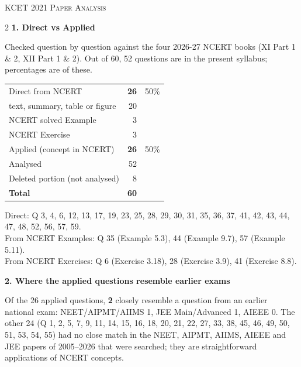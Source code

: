 \clearpage
\begin{center}{}\par
{\fontsize{20}{24}\selectfont\color{navy}\scshape KCET 2021 \textperiodcentered{} Paper Analysis}\par
{\color{gilt}}\end{center}
\vspace{4pt}
\begin{multicols}{2}
\textbf{\color{crimson}1. Direct vs Applied}\par\smallskip
{\footnotesize Checked question by question against the four 2026-27 NCERT books (XI Part 1 \& 2, XII Part 1 \& 2). Out of 60, 52 questions are in the present syllabus; percentages are of these.}\par\smallskip
\begin{tabular}{@{}lrr@{}}\toprule
Direct from NCERT & \textbf{26} & 50\%\\
\quad text, summary, table or figure & 20 &\\
\quad NCERT solved Example & 3 &\\
\quad NCERT Exercise & 3 &\\
Applied (concept in NCERT) & \textbf{26} & 50\%\\\midrule
Analysed & 52 &\\
Deleted portion (not analysed) & 8 &\\\midrule
\textbf{Total} & \textbf{60} &\\\bottomrule\end{tabular}\par\smallskip
{\footnotesize Direct: Q 3, 4, 6, 12, 13, 17, 19, 23, 25, 28, 29, 30, 31, 35, 36, 37, 41, 42, 43, 44, 47, 48, 52, 56, 57, 59.\\ From NCERT Examples: Q 35 (Example 5.3), 44 (Example 9.7), 57 (Example 5.11).\\ From NCERT Exercises: Q 6 (Exercise 3.18), 28 (Exercise 3.9), 41 (Exercise 8.8).}\par\medskip
\textbf{\color{crimson}2. Where the applied questions resemble earlier exams}\par\smallskip
Of the 26 applied questions, \textbf{2} closely resemble a question from an earlier national exam:
NEET/AIPMT/AIIMS 1, JEE Main/Advanced 1, AIEEE 0. The other 24 (Q 1, 2, 5, 7, 9, 11, 14, 15, 16, 18, 20, 21, 22, 27, 33, 38, 45, 46, 49, 50, 51, 53, 54, 55) had no close match in the NEET, AIPMT, AIIMS, AIEEE and JEE papers of 2005--2026 that were searched; they are straightforward applications of NCERT concepts.\par

\end{multicols}
